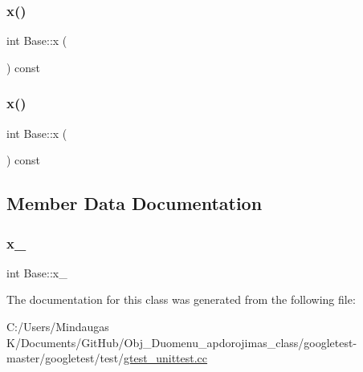 \mbox{\label{class_base_a779fd2b157ebd763b15383d96047e07c}} 
\subsubsection{\texorpdfstring{x()}{x()}\hspace{0.1cm}{\footnotesize\ttfamily [2/3]}}
{\footnotesize\ttfamily int Base\+::x (\begin{DoxyParamCaption}{ }\end{DoxyParamCaption}) const\hspace{0.3cm}{\ttfamily [inline]}}

\mbox{\label{class_base_a779fd2b157ebd763b15383d96047e07c}} 
\subsubsection{\texorpdfstring{x()}{x()}\hspace{0.1cm}{\footnotesize\ttfamily [3/3]}}
{\footnotesize\ttfamily int Base\+::x (\begin{DoxyParamCaption}{ }\end{DoxyParamCaption}) const\hspace{0.3cm}{\ttfamily [inline]}}



\subsection{Member Data Documentation}
\mbox{\label{class_base_a52a6455160a570c261fe257b5d785707}} 
\subsubsection{\texorpdfstring{x\_}{x\_}}
{\footnotesize\ttfamily int Base\+::x\+\_\+\hspace{0.3cm}{\ttfamily [private]}}



The documentation for this class was generated from the following file\+:\begin{DoxyCompactItemize}
\item 
C\+:/\+Users/\+Mindaugas K/\+Documents/\+Git\+Hub/\+Obj\+\_\+\+Duomenu\+\_\+apdorojimas\+\_\+class/googletest-\/master/googletest/test/\mbox{\hyperlink{googletest-master_2googletest_2test_2gtest__unittest_8cc}{gtest\+\_\+unittest.\+cc}}\end{DoxyCompactItemize}
